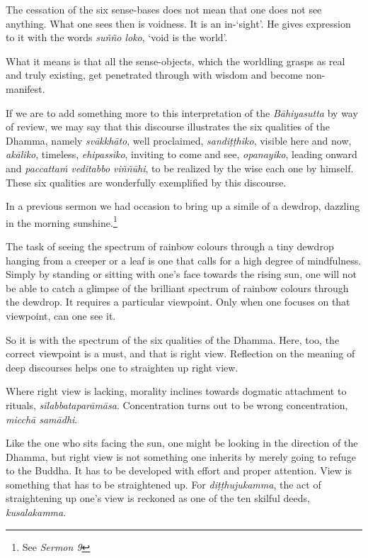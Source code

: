 The cessation of the six sense-bases does not mean that one does not see anything. What one sees then is voidness. It is an in-`sight'. He gives expression to it with the words \emph{suñño loko}, `void is the world'.

What it means is that all the sense-objects, which the worldling grasps as real and truly existing, get penetrated through with wisdom and become non-manifest.

If we are to add something more to this interpretation of the \emph{Bāhiyasutta} by way of review, we may say that this discourse illustrates the six qualities of the Dhamma, namely \emph{svākkhāto}, well proclaimed, \emph{sandiṭṭhiko}, visible here and now, \emph{akāliko}, timeless, \emph{ehipassiko}, inviting to come and see, \emph{opanayiko}, leading onward and \emph{paccattaṁ veditabbo viññūhi}, to be realized by the wise each one by himself. These six qualities are wonderfully exemplified by this discourse.

In a previous sermon we had occasion to bring up a simile of a dewdrop, dazzling in the morning sunshine.\footnote{See \emph{Sermon 9}}

The task of seeing the spectrum of rainbow colours through a tiny dewdrop hanging from a creeper or a leaf is one that calls for a high degree of mindfulness. Simply by standing or sitting with one's face towards the rising sun, one will not be able to catch a glimpse of the brilliant spectrum of rainbow colours through the dewdrop. It requires a particular viewpoint. Only when one focuses on that viewpoint, can one see it.

So it is with the spectrum of the six qualities of the Dhamma. Here, too, the correct viewpoint is a must, and that is right view. Reflection on the meaning of deep discourses helps one to straighten up right view.

Where right view is lacking, morality inclines towards dogmatic attachment to rituals, \emph{sīlabbataparāmāsa}. Concentration turns out to be wrong concentration, \emph{micchā samādhi}.

Like the one who sits facing the sun, one might be looking in the direction of the Dhamma, but right view is not something one inherits by merely going to refuge to the Buddha. It has to be developed with effort and proper attention. View is something that has to be straightened up. For \emph{diṭṭhujukamma}, the act of straightening up one's view is reckoned as one of the ten skilful deeds, \emph{kusalakamma}.

